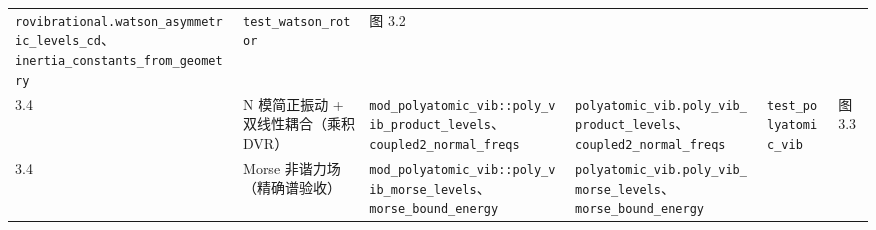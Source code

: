 \documentclass[
]{ctexbook}
\begin{document}
\begin{longtable}[]{@{}llllll@{}}
\begin{minipage}[t]{0.14\columnwidth}
\texttt{rovibrational.watson\_asymmetric\_levels\_cd}、\texttt{inertia\_constants\_from\_geometry}\strut
\end{minipage} & \begin{minipage}[t]{0.14\columnwidth}\raggedright
\texttt{test\_watson\_rotor}\strut
\end{minipage} & \begin{minipage}[t]{0.14\columnwidth}\raggedright
图 3.2\strut
\end{minipage}\tabularnewline
\begin{minipage}[t]{0.14\columnwidth}\raggedright
3.4\strut
\end{minipage} & \begin{minipage}[t]{0.14\columnwidth}\raggedright
N 模简正振动 + 双线性耦合（乘积 DVR）\strut
\end{minipage} & \begin{minipage}[t]{0.14\columnwidth}\raggedright
\texttt{mod\_polyatomic\_vib::poly\_vib\_product\_levels}、\texttt{coupled2\_normal\_freqs}\strut
\end{minipage} & \begin{minipage}[t]{0.14\columnwidth}\raggedright
\texttt{polyatomic\_vib.poly\_vib\_product\_levels}、\texttt{coupled2\_normal\_freqs}\strut
\end{minipage} & \begin{minipage}[t]{0.14\columnwidth}\raggedright
\texttt{test\_polyatomic\_vib}\strut
\end{minipage} & \begin{minipage}[t]{0.14\columnwidth}\raggedright
图 3.3\strut
\end{minipage}\tabularnewline
\begin{minipage}[t]{0.14\columnwidth}\raggedright
3.4\strut
\end{minipage} & \begin{minipage}[t]{0.14\columnwidth}\raggedright
Morse 非谐力场（精确谱验收）\strut
\end{minipage} & \begin{minipage}[t]{0.14\columnwidth}\raggedright
\texttt{mod\_polyatomic\_vib::poly\_vib\_morse\_levels}、\texttt{morse\_bound\_energy}\strut
\end{minipage} & \begin{minipage}[t]{0.14\columnwidth}\raggedright
\texttt{polyatomic\_vib.poly\_vib\_morse\_levels}、\texttt{morse\_bound\_energy}\strut
\end{minipage} & \begin{minipage}[t]{0.14\columnwidth}\raggedright

\end{minipage}
\end{longtable}
\end{document}
